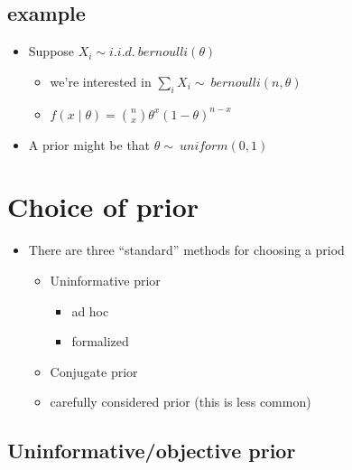\subsection{example}

\begin{itemize}
\item Suppose $X_i ∼ i.i.d.\ bernoulli(θ)$
\begin{itemize}
\item we're interested in $∑_i X_i ∼\ bernoulli(n, θ)$
\item $f(x ∣ θ) = \binom{n}{x} θ^x (1-θ)^{n-x}$
\end{itemize}
\item A prior might be that $θ ∼\ uniform(0,1)$
\end{itemize}

\section{Choice of prior}

\begin{itemize}
\item There are three ``standard'' methods for choosing a priod
\begin{itemize}
\item Uninformative prior
\begin{itemize}
\item ad hoc
\item formalized
\end{itemize}
\item Conjugate prior
\item carefully considered prior (this is less common)
\end{itemize}
\end{itemize}

\subsection{Uninformative/objective prior}

